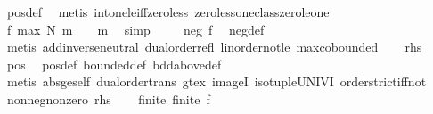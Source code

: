\begin{isabellebody}
\ pos{\isacharunderscore}{\kern0pt}def\ \isamarkupfalse%
\ {\isacharparenleft}{\kern0pt}metis\ int{\isacharunderscore}{\kern0pt}one{\isacharunderscore}{\kern0pt}le{\isacharunderscore}{\kern0pt}iff{\isacharunderscore}{\kern0pt}zero{\isacharunderscore}{\kern0pt}less\ zero{\isacharunderscore}{\kern0pt}less{\isacharunderscore}{\kern0pt}one{\isacharunderscore}{\kern0pt}class{\isachardot}{\kern0pt}zero{\isacharunderscore}{\kern0pt}le{\isacharunderscore}{\kern0pt}one{\isacharparenright}{\kern0pt}\isanewline
\ \ \isamarkupfalse%
\ {\isachardoublequoteopen}f\ {\isacharparenleft}{\kern0pt}max\ N\ m{\isacharparenright}{\kern0pt}\ {\isachargreater}{\kern0pt}\ {}{\isachardoublequoteclose}\ \ m\ \isamarkupfalse%
\ simp\isanewline
\ \ \isamarkupfalse%
\ {\isachardoublequoteopen}{\isasymnot}\ neg\ f{\isachardoublequoteclose}\ \isamarkupfalse%
\ neg{\isacharunderscore}{\kern0pt}def\ \isamarkupfalse%
\ {\isacharparenleft}{\kern0pt}metis\ add{\isachardot}{\kern0pt}inverse{\isacharunderscore}{\kern0pt}neutral\ dual{\isacharunderscore}{\kern0pt}order{\isachardot}{\kern0pt}refl\ linorder{\isacharunderscore}{\kern0pt}not{\isacharunderscore}{\kern0pt}le\ max{\isachardot}{\kern0pt}cobounded{}{\isacharparenright}{\kern0pt}\isanewline
\ \ \isamarkupfalse%
\ {\isacharquery}{\kern0pt}rhs\ \isamarkupfalse%
\ pos\ \isamarkupfalse%
\ pos{\isacharunderscore}{\kern0pt}def\ bounded{\isacharunderscore}{\kern0pt}def\ bdd{\isacharunderscore}{\kern0pt}above{\isacharunderscore}{\kern0pt}def\ \isamarkupfalse%
\ {\isacharparenleft}{\kern0pt}metis\ abs{\isacharunderscore}{\kern0pt}ge{\isacharunderscore}{\kern0pt}self\ dual{\isacharunderscore}{\kern0pt}order{\isachardot}{\kern0pt}trans\ gt{\isacharunderscore}{\kern0pt}ex\ imageI\ iso{\isacharunderscore}{\kern0pt}tuple{\isacharunderscore}{\kern0pt}UNIV{\isacharunderscore}{\kern0pt}I\ order{\isachardot}{\kern0pt}strict{\isacharunderscore}{\kern0pt}iff{\isacharunderscore}{\kern0pt}not{\isacharparenright}{\kern0pt}\isanewline
{}\isamarkupfalse%
\isanewline
\ \ \isamarkupfalse%
\ nonneg{\isacharunderscore}{\kern0pt}nonzero{\isacharcolon}{\kern0pt}\ {\isacharquery}{\kern0pt}rhs\isanewline
\ \ \isamarkupfalse%
\ finite{\isacharcolon}{\kern0pt}\ {\isachardoublequoteopen}finite\ {\isacharparenleft}{\kern0pt}f\ {\isacharbackquote}{\kern0pt}\ {\isacharbraceleft}{\kern0pt}{}{\isachardot}{\kern0pt}{\isachardot}{\kern0pt}{\isacharbraceright}{\kern0pt}\ {\isasyminter}\ {\isacharbraceleft}{\kern0pt}{\isachardot}{\kern0pt}{\isachardot}{\kern0pt}{\isacharless}{\kern0pt}{}{\isacharbraceright}{\kern0pt}{\isacharparenright}{\kern0pt}{\isachardoublequoteclose}\ \isamarkupfalse%

\end{isabellebody}
